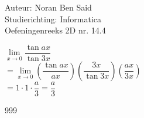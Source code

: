 \documentclass[a4paper]{article}
\begin{document}
\noindent \large Auteur: Noran Ben Said\\
\noindent \large Studierichting: Informatica\\
\noindent \large Oefeningenreeks 2D nr. 14.4 \\

\medskip
\normalsize

$ \lim\limits_{x \to 0} \dfrac{\tan ax}{\tan 3x}$\\

$ = \lim\limits_{x \to 0} 
\left( \dfrac{\tan ax}{ax} \right)
\left( \dfrac{3x}{\tan 3x} \right)
\left( \dfrac{ax}{3x} \right)$\\

$ = 1 \cdot 1 \cdot \dfrac{a}{3} = \dfrac{a}{3}$



\begin{thebibliography}{999}
\end{thebibliography}
\end{document}
